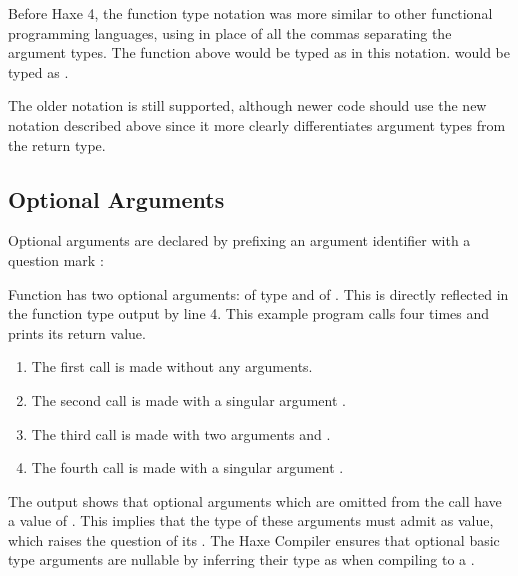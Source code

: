Before Haxe 4, the function type notation was more similar to other functional programming languages, using \expr{->} in place of all the commas separating the argument types. The  function above would be typed as  in this notation.  would be typed as .

The older notation is still supported, although newer code should use the new notation described above since it more clearly differentiates argument types from the return type.




\subsection{Optional Arguments}
\label{types-function-optional-arguments}

Optional arguments are declared by prefixing an argument identifier with a question mark :

Function  has two optional arguments:  of type  and  of . This is directly reflected in the function type output by line 4. 
This example program calls  four times and prints its return value.

\begin{enumerate}
	\item The first call is made without any arguments.
	\item The second call is made with a singular argument .
	\item The third call is made with two arguments  and .
	\item The fourth call is made with a singular argument .
\end{enumerate}
The output shows that optional arguments which are omitted from the call have a value of . This implies that the type of these arguments must admit  as value, which raises the question of its . The Haxe Compiler ensures that optional basic type arguments are nullable by inferring their type as  when compiling to a .


